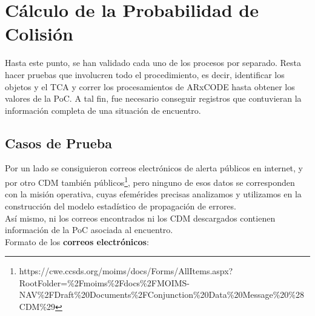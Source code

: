 \section{C\'alculo de la Probabilidad de Colisi\'on}

Hasta este punto, se han validado cada uno de los procesos por separado.
Resta hacer pruebas que involucren todo el procedimiento, es decir, identificar los objetos y el TCA y correr los procesamientos de ARxCODE hasta obtener los valores de la PoC.
A tal fin, fue necesario conseguir registros que contuvieran la informaci\'on completa de una situaci\'on de encuentro.\\

\subsection*{Casos de Prueba}
Por un lado se consiguieron correos electr\'onicos de alerta p\'ublicos en internet, y por otro CDM tambi\'en p\'ublicos\footnote{https://cwe.ccsds.org/moims/docs/Forms/AllItems.aspx?RootFolder=\%2Fmoims\%2Fdocs\%2FMOIMS-NAV\%2FDraft\%20Documents\%2FConjunction\%20Data\%20Message\%20\%28CDM\%29}, pero ninguno de esos datos se corresponden con la misi\'on operativa, cuyas efem\'erides precisas analizamos y utilizamos en la construcci\'on del modelo estad\'istico de propagaci\'on de errores.\\
As\'i mismo, ni los correos encontrados ni los CDM descargados contienen informaci\'on de la PoC asociada al encuentro.\\

Formato de los {\bf{correos electr\'onicos}}:\\
\begin{center}
\label{box:mail}
\end{center}


